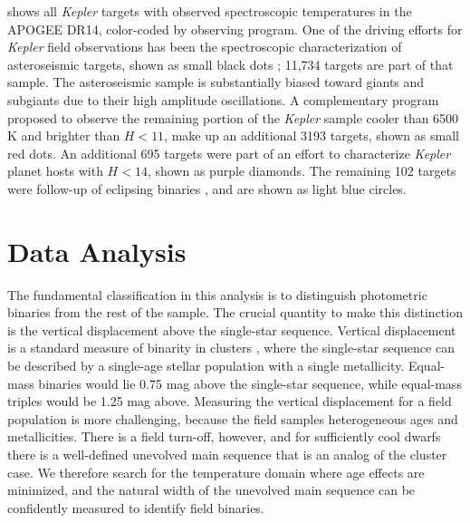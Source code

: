 \documentclass[manuscript]{aastex6}
\newcommand{\Kepler}{\mbox{\textit{Kepler}}}
\newcommand{\Teff}{\ensuremath{T_{\rm eff}}}
\begin{document}
\begin{figure*}[htb]
    \centering
    \caption{\emph{Left:} \Teff-\(M_K\) diagram for the APOGEE observations of
        \Kepler{} targets. Asteroseismic targets are shown as black dots. The
        dwarf sample is shown as brown dots. The light blue dots indicate 
        eclipsing binary targets and purple dots are \Kepler{} Objects of 
        Interest. A binary sequence is clearly visible on the lower main
        sequence. Temperatures are spectrosopic APOGEE temperatures. A 
        representative error bar for the cool dwarf sample is 
        shown in the bottom-right corner. \emph{Right:} A density plot of the 
        full APOGEE sample. To preserve the dynamic range of the dwarf 
        sequence, the red clump was allowed to saturate. The bin size is 100 K
    horizontally and 0.02 mag vertically.}\label{fig:apogee_selection}
\end{figure*}

 shows all \Kepler{} targets with observed
spectroscopic temperatures in the APOGEE DR14, color-coded by observing
program. One of the driving efforts for \Kepler{} field observations has been
the spectroscopic characterization of asteroseismic targets, shown as small
black dots \citep{Zasowski17,Pinsonneault18}; 11,734 targets are part of that
sample. The asteroseismic sample is substantially biased toward giants 
and subgiants due to their high amplitude oscillations. A complementary 
program proposed to observe the remaining portion of the \Kepler{} sample 
cooler than 6500 K and brighter than \(H < 11\), make up an additional 3193
targets, shown as small red dots. An additional 695 targets were part of an 
effort to characterize \Kepler{} planet hosts with \(H < 14\), shown as purple 
diamonds. The remaining 102 targets were follow-up of eclipsing binaries 
\citep{Prsa11,Slawson11}, and are shown as light blue circles.  

\section{Data Analysis}
\label{sec:analysis}

The fundamental classification in this analysis is to distinguish photometric
binaries from the rest of the sample. The crucial quantity to make this
distinction is the 
vertical displacement above the single-star sequence. Vertical 
displacement is a standard measure of binarity in clusters 
\citep{Mermilliod92}, where the single-star sequence can be described by a
single-age stellar population with a single metallicity. Equal-mass binaries
would lie 0.75 mag above the single-star sequence, while equal-mass triples would be
1.25 mag above. Measuring the vertical displacement for a field population is 
more challenging, because the
field samples heterogeneous ages and metallicities. There is a
field turn-off, however, and for sufficiently cool dwarfs there is a
well-defined unevolved main sequence that is an analog of the cluster case. We
therefore search for the temperature domain where age effects are minimized, 
and the natural width of the unevolved main sequence can be confidently
measured to identify field binaries.
\end{document}
